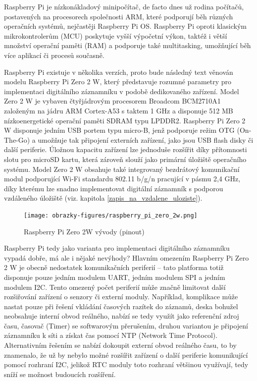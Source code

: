 Raspberry Pi je nízkonákladový minipočítač, de facto dnes už rodina počítačů, postavených na procesorech společnosti ARM, které podporují běh různých operačních systémů, nejčastěji Raspberry Pi OS. Raspberry Pi oproti klasickým mikrokontrolerům (MCU) poskytuje vyšší výpočetní výkon, taktéž i větší množství operační paměti (RAM) a podporuje také multitasking, umožňující běh více aplikací či procesů současně.

Raspberry Pi existuje v několika verzích, proto bude následný text věnován modelu Raspberry Pi Zero 2 W, který představuje rozumné parametry pro implementaci digitálního záznamníku v podobě dedikovaného zařízení. Model Zero 2 W je vybaven čtyřjádrovým procesorem Broadcom BCM2710A1 založeným na jádru ARM Cortex-A53 s taktem 1 GHz a disponuje 512 MB nízkoenergetické operační paměti SDRAM typu LPDDR2. Raspberry Pi Zero 2 W disponuje jedním USB portem typu micro-B, jenž podporuje režim OTG (On-The-Go) a umožňuje tak připojení externích zařízení, jako jsou USB flash disky či další periferie. Úložnou kapacitu zařízení lze jednoduše rozšířit díky přítomnosti slotu pro microSD kartu, která zároveň slouží jako primární úložiště operačního systému. Model Zero 2 W obsahuje také integrovaný bezdrátový komunikační modul podporující Wi-Fi standardu 802.11 b/g/n pracující v pásmu 2,4 GHz, díky kterému lze snadno implementovat digitální záznamník s podporou vzdáleného úložiště (viz. kapitola \ref{zapis_na_vzdalene_uloziste}).

\newpage

\begin{figure}[h]
    \centering
    \texttt{[image: obrazky-figures/raspberry\_pi\_zero\_2w.png]}
    
    \caption{Raspberry Pi Zero 2W vývody (pinout) \cite{arduino_shop_due}}
    \label{fig:raspberry-pi-zero-2w}
\end{figure}

Raspberry Pi tedy jako varianta pro implementaci digitálního záznamníku vypadá dobře, má ale i nějaké nevýhody? Hlavním omezením Raspberry Pi Zero 2 W je obecně nedostatek komunikačních periferií – tato platforma totiž disponuje pouze jedním modulem UART, jedním modulem SPI a jedním modulem I2C. Tento omezený počet periferií může značně limitovat další rozšiřování zařízení o senzory či externí moduly. Například, komplikace může nastat pouze při řešení vkládání časových razítek do záznamů, deska bohužel neobsahuje interní obvod reálného, nabízí se  tedy využít jako referenční zdroj času, časovač (Timer) se softwarovým přerušením, druhou variantou je připojení záznamníku k síti a získat čas pomocí NTP (Network Time Protocol). Alternativním řešením se nabízí dokoupit externí obvod reálného času, to by znamenalo, že už by nebylo možné rozšířit zařízení o další periferie komunikující pomocí rozhraní I2C, jelikož RTC moduly toto rozhraní většinou využívají, tedy sníží se možnost budoucích rozšíření.

